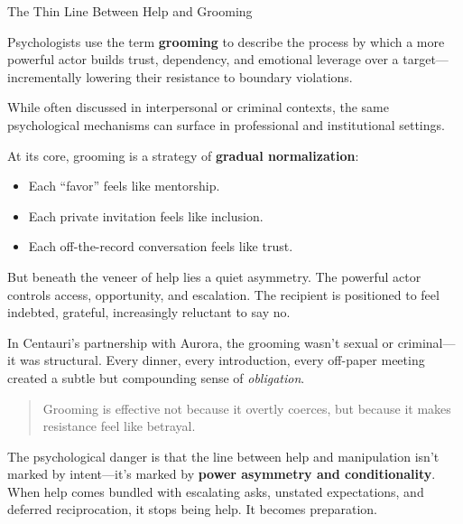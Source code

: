 \begin{PsychologicalSidebar}{The Thin Line Between Help and Grooming}

  Psychologists use the term \textbf{grooming} to describe the process by which a more powerful actor builds trust, 
  dependency, and emotional leverage over a target—incrementally lowering their resistance to boundary violations.

  \medskip
  
  While often discussed in interpersonal or criminal contexts, the same psychological mechanisms can surface in 
  professional and institutional settings.

  \medskip
  
  At its core, grooming is a strategy of \textbf{gradual normalization}:  

  \begin{itemize}
    \item Each “favor” feels like mentorship.  
    \item Each private invitation feels like inclusion.  
    \item Each off-the-record conversation feels like trust.
  \end{itemize}

  \medskip
  
  But beneath the veneer of help lies a quiet asymmetry. The powerful actor controls access, opportunity, and escalation. 
  The recipient is positioned to feel indebted, grateful, increasingly reluctant to say no.

  \medskip
  
  In Centauri’s partnership with Aurora, the grooming wasn’t sexual or criminal—it was structural. Every dinner, every 
  introduction, every off-paper meeting created a subtle but compounding sense of \emph{obligation}.
  
  \begin{quote}
  Grooming is effective not because it overtly coerces,  but because it makes resistance feel like betrayal.
  \end{quote}
  
  The psychological danger is that the line between help and manipulation isn’t marked by intent—it’s marked by 
  \textbf{power asymmetry and conditionality}.  When help comes bundled with escalating asks, unstated expectations, 
  and deferred reciprocation, it stops being help.  It becomes preparation.
  
\end{PsychologicalSidebar}

